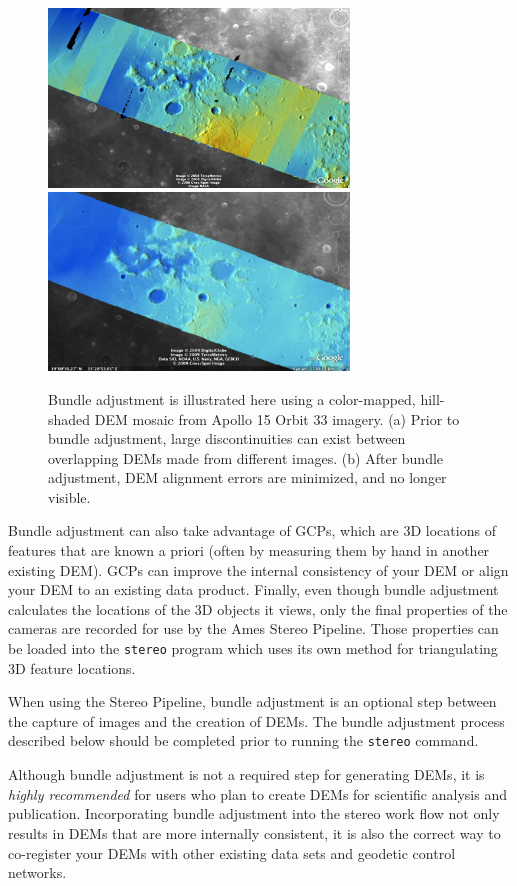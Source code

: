 \begin{figure}[bt]
  \centering
  \includegraphics[width=8cm]{images/ba_orig}
  \includegraphics[width=8cm]{images/ba_adjusted}
  \caption{Bundle adjustment is illustrated here using a color-mapped,
    hill-shaded DEM mosaic from Apollo 15 Orbit 33 imagery. (a)
    Prior to bundle adjustment, large discontinuities can exist between
    overlapping DEMs made from different images. (b) After bundle
    adjustment, DEM alignment errors are minimized, and no longer visible.}
  \label{fig:bundle_adjustment}
\end{figure}

Bundle adjustment can also take advantage of \acp{GCP}, which are
3D locations of features that are known a priori (often by measuring
them by hand in another existing \ac{DEM}). \acp{GCP} can improve the internal
consistency of your \ac{DEM} or align your \ac{DEM} to an existing data
product. Finally, even though bundle adjustment calculates the
locations of the 3D objects it views, only the final properties of
the cameras are recorded for use by the Ames Stereo Pipeline. Those
properties can be loaded into the \texttt{stereo} program which
uses its own method for triangulating 3D feature locations.

When using the Stereo Pipeline, bundle adjustment is an optional step
between the capture of images and the creation of \acp{DEM}.  The bundle
adjustment process described below should be completed prior to
running the \texttt{stereo} command.

Although bundle adjustment is not a required step for generating
\acp{DEM}, it is {\em highly recommended} for users who plan to
create \acp{DEM} for scientific analysis and publication.  Incorporating
bundle adjustment into the stereo work flow not only results in
\acp{DEM} that are more internally consistent, it is also the correct
way to co-register your \acp{DEM} with other existing data sets and
geodetic control networks.


